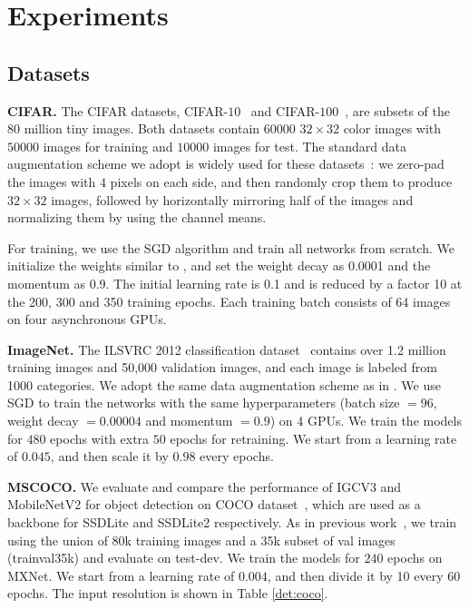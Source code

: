 \documentclass{bmvc2k}
\begin{document}
	\section{Experiments}
	\label{sec:exp}
	\subsection{Datasets}
	\noindent\textbf{CIFAR.}
	The CIFAR datasets, CIFAR-$10$~\cite{Cifar10} and CIFAR-$100$~\cite{Cifar100},
	are subsets of the $80$ million tiny images.
	Both datasets contain $60000$ $32\times32$ color images with $50000$ images for training and $10000$ images for test. 
	The standard data augmentation scheme we adopt is widely used for these datasets~\cite{HeZRS16, LeeXGZT15, HuangLW16a, LarssonMS16a, LinCY13, RomeroBKCGB14, SpringenbergDBR14, SrivastavaGS15}: we zero-pad the images with $4$ pixels on each side, and then randomly crop them to produce $32\times32$ images, followed by horizontally mirroring half of the images and normalizing them by using the channel means.
	
	For training, we use the SGD algorithm and train all networks from scratch. We initialize the weights similar to \cite{HeZRS16, HeZRS16ECCV}, and set the weight decay as 0.0001 and the momentum as 0.9. The initial learning rate is 0.1 and is reduced by a factor 10 at the 200, 300 and 350 training epochs. Each training batch consists of 64 images on four asynchronous GPUs.
	
	\noindent\textbf{ImageNet.} The ILSVRC 2012 classification dataset~\cite{deng2009imagenet} contains over 1.2 million training images and 50,000 validation images, and each image is labeled from 1000 categories. We adopt the same data augmentation scheme as in \cite{HeZRS16,HeZRS16ECCV}. We use SGD to train the networks with the same hyperparameters (batch size $=96$, weight decay $=0.00004$ and momentum $=0.9$) on 4 GPUs. We train the models for $480$ epochs with extra $50$ epochs for retraining. We start from a learning rate of $0.045$, and then scale it by $0.98$ every epochs.
	
	\noindent\textbf{MSCOCO.} We evaluate and compare the performance of IGCV3 and MobileNetV2 for object detection on COCO dataset~\cite{lin2014microsoft}, which are used as a backbone for SSDLite and SSDLite2 respectively. As in previous work~\cite{sandler2018inverted}, we train using the union of 80k training images and a 35k subset of val images (trainval35k) and evaluate on test-dev.
	We train the models for $240$ epochs on MXNet. We start from a learning rate of $0.004$, and then divide it by 10 every 60 epochs. The input resolution is shown in Table \ref{det:coco}.
\end{document}
